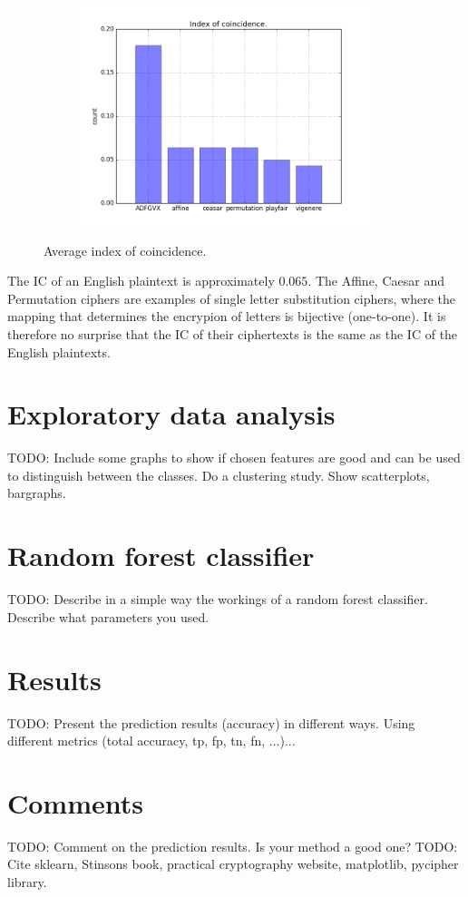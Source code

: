 \documentclass[a4paper]{article}
\begin{document}
\begin{figure}[H]
    \centering
    \begin{subfigure}[h]{0.5\textwidth}
        \centering
        \includegraphics[height=2.5in]{img/iocs.png}
    \end{subfigure}
    \caption{Average index of coincidence.}
    \label{fig:ioc}
\end{figure}

The IC of an English plaintext is approximately $0.065$. The Affine, Caesar and Permutation ciphers are examples of single letter substitution ciphers, where the mapping that determines the encrypion of letters is bijective (one-to-one). It is therefore no surprise that the IC of their ciphertexts is the same as the IC of the English plaintexts.

\section*{Exploratory data analysis}
TODO: Include some graphs to show if chosen features are good and can be used to distinguish between the classes. Do a clustering study. Show scatterplots, bargraphs.

\section*{Random forest classifier}
TODO: Describe in a simple way the workings of a random forest classifier. Describe what parameters you used.


\section*{Results}
TODO: Present the prediction results (accuracy) in different ways. Using different metrics (total accuracy, tp, fp, tn, fn, ...)...


\section*{Comments}
TODO: Comment on the prediction results. Is your method a good one?
TODO: Cite sklearn, Stinsons book, practical cryptography website, matplotlib, pycipher library.



\end{document}
